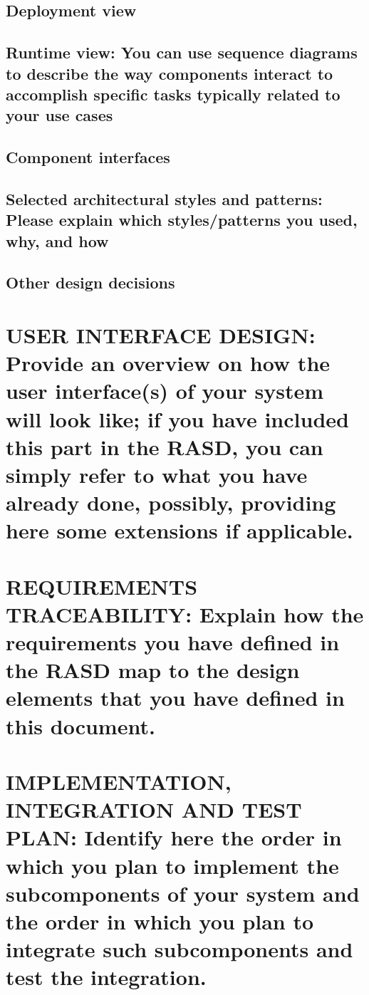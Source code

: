 \documentclass[12pt,a4paper]{article}
\begin{document}
\subsection{Deployment view}
\subsection{Runtime view: You can use sequence diagrams to describe the way components interact to accomplish specific tasks typically related to your use cases}
\subsection{Component interfaces}
\subsection{Selected architectural styles and patterns: Please explain which styles/patterns you used, why, and how}
\subsection{Other design decisions}
\section{USER INTERFACE DESIGN: Provide an overview on how the user interface(s) of your system will look like; if you have included this part in the RASD, you can simply refer to what you have already done, possibly, providing here some extensions if applicable.}
\section{REQUIREMENTS TRACEABILITY: Explain how the requirements you have defined in the RASD map to the design elements that you have defined in this document.}
\section{IMPLEMENTATION, INTEGRATION AND TEST PLAN: Identify here the order in which you plan to implement the subcomponents of your system and the order in which you plan to integrate such subcomponents and test the integration.}
\end{document}
